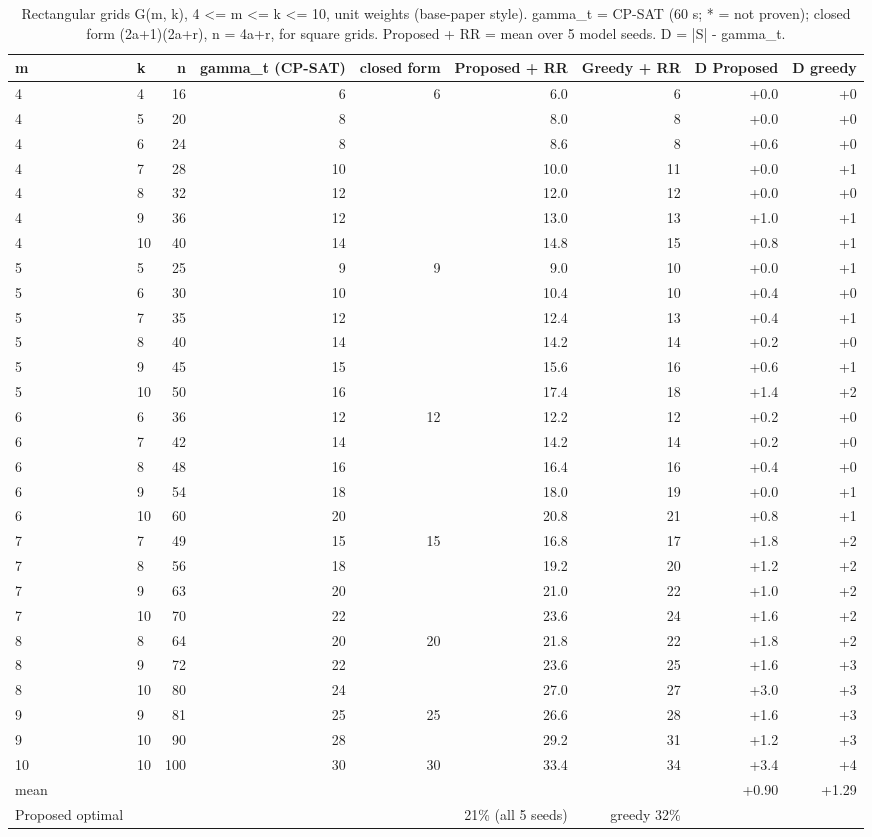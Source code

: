\begin{table}[t]
\centering
\caption{Rectangular grids G(m, k), 4 <= m <= k <= 10, unit weights (base-paper style). gamma_t = CP-SAT (60 s; * = not proven); closed form (2a+1)(2a+r), n = 4a+r, for square grids. Proposed + RR = mean over 5 model seeds. D = |S| - gamma_t.}
\label{tab:grid_mxk}
\scriptsize
\begin{tabular}{llrrrrrrr}
\toprule
m & k & n & gamma\_t (CP-SAT) & closed form & Proposed + RR & Greedy + RR & D Proposed & D greedy \\
\midrule
4 & 4 & 16 & 6 & 6 & 6.0 & 6 & +0.0 & +0 \\
4 & 5 & 20 & 8 &  & 8.0 & 8 & +0.0 & +0 \\
4 & 6 & 24 & 8 &  & 8.6 & 8 & +0.6 & +0 \\
4 & 7 & 28 & 10 &  & 10.0 & 11 & +0.0 & +1 \\
4 & 8 & 32 & 12 &  & 12.0 & 12 & +0.0 & +0 \\
4 & 9 & 36 & 12 &  & 13.0 & 13 & +1.0 & +1 \\
4 & 10 & 40 & 14 &  & 14.8 & 15 & +0.8 & +1 \\
5 & 5 & 25 & 9 & 9 & 9.0 & 10 & +0.0 & +1 \\
5 & 6 & 30 & 10 &  & 10.4 & 10 & +0.4 & +0 \\
5 & 7 & 35 & 12 &  & 12.4 & 13 & +0.4 & +1 \\
5 & 8 & 40 & 14 &  & 14.2 & 14 & +0.2 & +0 \\
5 & 9 & 45 & 15 &  & 15.6 & 16 & +0.6 & +1 \\
5 & 10 & 50 & 16 &  & 17.4 & 18 & +1.4 & +2 \\
6 & 6 & 36 & 12 & 12 & 12.2 & 12 & +0.2 & +0 \\
6 & 7 & 42 & 14 &  & 14.2 & 14 & +0.2 & +0 \\
6 & 8 & 48 & 16 &  & 16.4 & 16 & +0.4 & +0 \\
6 & 9 & 54 & 18 &  & 18.0 & 19 & +0.0 & +1 \\
6 & 10 & 60 & 20 &  & 20.8 & 21 & +0.8 & +1 \\
7 & 7 & 49 & 15 & 15 & 16.8 & 17 & +1.8 & +2 \\
7 & 8 & 56 & 18 &  & 19.2 & 20 & +1.2 & +2 \\
7 & 9 & 63 & 20 &  & 21.0 & 22 & +1.0 & +2 \\
7 & 10 & 70 & 22 &  & 23.6 & 24 & +1.6 & +2 \\
8 & 8 & 64 & 20 & 20 & 21.8 & 22 & +1.8 & +2 \\
8 & 9 & 72 & 22 &  & 23.6 & 25 & +1.6 & +3 \\
8 & 10 & 80 & 24 &  & 27.0 & 27 & +3.0 & +3 \\
9 & 9 & 81 & 25 & 25 & 26.6 & 28 & +1.6 & +3 \\
9 & 10 & 90 & 28 &  & 29.2 & 31 & +1.2 & +3 \\
10 & 10 & 100 & 30 & 30 & 33.4 & 34 & +3.4 & +4 \\
mean &  &  &  &  &  &  & +0.90 & +1.29 \\
Proposed optimal &  &  &  &  & 21\% (all 5 seeds) & greedy 32\% &  &  \\
\bottomrule
\end{tabular}
\end{table}

